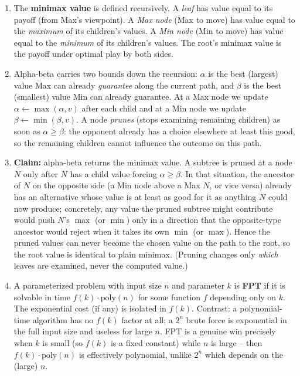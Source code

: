 \documentclass[11pt]{article}
\begin{document}
\begin{enumerate}[label=\textbf{A\arabic*.}, leftmargin=2.2em]
\item The \textbf{minimax value} is defined recursively. A \emph{leaf} has value
equal to its payoff (from Max's viewpoint). A \emph{Max node} (Max to move) has
value equal to the \emph{maximum} of its children's values. A \emph{Min node}
(Min to move) has value equal to the \emph{minimum} of its children's values.
The root's minimax value is the payoff under optimal play by both sides.

\item Alpha-beta carries two bounds down the recursion: $\alpha$ is the best
(largest) value Max can already \emph{guarantee} along the current path, and
$\beta$ is the best (smallest) value Min can already guarantee. At a Max node we
update $\alpha \gets \max(\alpha, v)$ after each child and at a Min node we
update $\beta \gets \min(\beta, v)$. A node \emph{prunes} (stops examining
remaining children) as soon as $\alpha \ge \beta$: the opponent already has a
choice elsewhere at least this good, so the remaining children cannot influence
the outcome on this path.

\item \textbf{Claim:} alpha-beta returns the minimax value. A subtree is pruned
at a node $N$ only after $N$ has a child value forcing $\alpha \ge \beta$. In
that situation, the ancestor of $N$ on the opposite side (a Min node above a Max
$N$, or vice versa) already has an alternative whose value is at least as good
for it as anything $N$ could now produce; concretely, any value the pruned
subtree might contribute would push $N$'s $\max$ (or $\min$) only in a direction
that the opposite-type ancestor would reject when it takes its own $\min$ (or
$\max$). Hence the pruned values can never become the chosen value on the path
to the root, so the root value is identical to plain minimax. (Pruning changes
only \emph{which} leaves are examined, never the computed value.)

\item A parameterized problem with input size $n$ and parameter $k$ is
\textbf{FPT} if it is solvable in time $f(k)\cdot \mathrm{poly}(n)$ for some
function $f$ depending only on $k$. The exponential cost (if any) is isolated in
$f(k)$. Contrast: a polynomial-time algorithm has no $f(k)$ factor at all; a
$2^n$ brute force is exponential in the full input size and useless for large
$n$. FPT is a genuine win precisely when $k$ is small (so $f(k)$ is a fixed
constant) while $n$ is large -- then $f(k)\cdot\mathrm{poly}(n)$ is effectively
polynomial, unlike $2^n$ which depends on the (large) $n$.


\end{enumerate}
\end{document}
